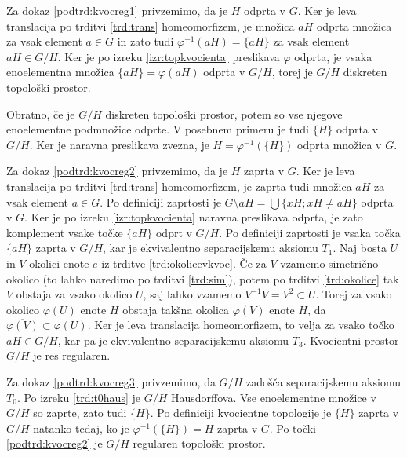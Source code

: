 \documentclass[mat1]{fmfdelo}
\newcommand{\closure}[1]{\overline{#1}}
\begin{document}
\begin{dokaz}
Za dokaz \ref{podtrd:kvocreg1} privzemimo, da je $H$ odprta v $G$. Ker je leva translacija po trditvi \ref{trd:trans} homeomorfizem, je množica $aH$ odprta množica za vsak element $a \in G$ in zato tudi $\varphi^{-1}(aH) = \lbrace aH \rbrace$ za vsak element $aH \in G/H$. Ker je po izreku \ref{izr:topkvocienta} preslikava $\varphi$ odprta, je vsaka enoelementna množica $\lbrace aH \rbrace = \varphi(aH)$ odprta v $G/H$, torej je $G/H$ diskreten topološki prostor.

Obratno, če je $G/H$ diskreten topološki prostor, potem so vse njegove enoelementne podmnožice odprte. V posebnem primeru je tudi $\lbrace H \rbrace$ odprta v $G/H$. Ker je naravna preslikava zvezna, je $H = \varphi^{-1}(\lbrace H \rbrace)$ odprta množica v $G$.

Za dokaz \ref{podtrd:kvocreg2} privzemimo, da je $H$ zaprta v $G$. Ker je leva translacija po trditvi \ref{trd:trans} homeomorfizem, je zaprta tudi množica $aH$ za vsak element $a \in G$. Po definiciji zaprtosti je $G\setminus aH = \bigcup \lbrace xH ; xH \neq aH \rbrace$ odprta v $G$. Ker je po izreku \ref{izr:topkvocienta} naravna preslikava odprta, je zato komplement vsake točke $\lbrace aH \rbrace$ odprt v $G/H$. Po definiciji zaprtosti je vsaka točka $\lbrace aH \rbrace$ zaprta v $G/H$, kar je ekvivalentno separacijskemu aksiomu $T_1$. Naj bosta $U$ in $V$ okolici enote $e$ iz trditve \ref{trd:okolicevkvoc}. Če za $V$ vzamemo simetrično okolico (to lahko naredimo po trditvi \ref{trd:sim}), potem po trditvi \ref{trd:okolice} tak $V$ obstaja za vsako okolico $U$, saj lahko vzamemo $V^{-1}V = V^2 \subset U$. Torej za vsako okolico $\varphi(U)$ enote $H$ obstaja takšna okolica $\varphi(V)$ enote $H$, da $\closure{\varphi(V)} \subset \varphi(U)$. Ker je leva translacija homeomorfizem, to velja za vsako točko $aH \in G/H$, kar pa je ekvivalentno separacijskemu aksiomu $T_3$. Kvocientni prostor $G/H$ je res regularen.

Za dokaz \ref{podtrd:kvocreg3} privzemimo, da $G/H$ zadošča separacijskemu aksiomu $T_0$. Po izreku \ref{trd:t0haus} je $G/H$ Hausdorffova. Vse enoelementne množice v $G/H$ so zaprte, zato tudi $\lbrace H \rbrace$. Po definiciji kvocientne topologije je $\lbrace H \rbrace$ zaprta v $G/H$ natanko tedaj, ko je $\varphi^{-1}(\lbrace H \rbrace) = H$ zaprta v $G$. Po točki \ref{podtrd:kvocreg2} je $G/H$ regularen topološki prostor.
\end{dokaz}
\end{document}
